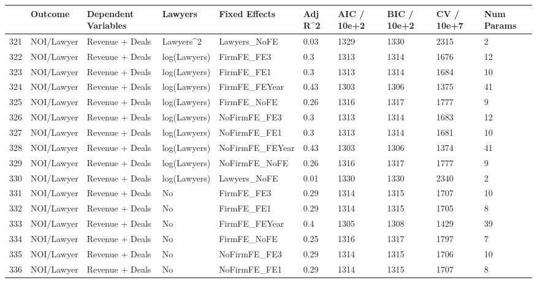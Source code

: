 \documentclass{article}
\begin{document}
\begin{table}[H]
\centering
\begin{tabular}{rlllllllll}
  \hline
 & Outcome & Dependent Variables & Lawyers & Fixed Effects & Adj R^2 & AIC / 10e+2 & BIC / 10e+2 & CV / 10e+7 & Num Params \\ 
  \hline
321 & NOI/Lawyer & Revenue + Deals & Lawyers^2 & Lawyers\_NoFE & 0.03 & 1329 & 1330 & 2315 & 2 \\ 
  322 & NOI/Lawyer & Revenue + Deals & log(Lawyers) & FirmFE\_FE3 & 0.3 & 1313 & 1314 & 1676 & 12 \\ 
  323 & NOI/Lawyer & Revenue + Deals & log(Lawyers) & FirmFE\_FE1 & 0.3 & 1313 & 1314 & 1684 & 10 \\ 
  324 & NOI/Lawyer & Revenue + Deals & log(Lawyers) & FirmFE\_FEYear & 0.43 & 1303 & 1306 & 1375 & 41 \\ 
  325 & NOI/Lawyer & Revenue + Deals & log(Lawyers) & FirmFE\_NoFE & 0.26 & 1316 & 1317 & 1777 & 9 \\ 
  326 & NOI/Lawyer & Revenue + Deals & log(Lawyers) & NoFirmFE\_FE3 & 0.3 & 1313 & 1314 & 1683 & 12 \\ 
  327 & NOI/Lawyer & Revenue + Deals & log(Lawyers) & NoFirmFE\_FE1 & 0.3 & 1313 & 1314 & 1681 & 10 \\ 
  328 & NOI/Lawyer & Revenue + Deals & log(Lawyers) & NoFirmFE\_FEYear & 0.43 & 1303 & 1306 & 1374 & 41 \\ 
  329 & NOI/Lawyer & Revenue + Deals & log(Lawyers) & NoFirmFE\_NoFE & 0.26 & 1316 & 1317 & 1777 & 9 \\ 
  330 & NOI/Lawyer & Revenue + Deals & log(Lawyers) & Lawyers\_NoFE & 0.01 & 1330 & 1330 & 2340 & 2 \\ 
  331 & NOI/Lawyer & Revenue + Deals & No & FirmFE\_FE3 & 0.29 & 1314 & 1315 & 1707 & 10 \\ 
  332 & NOI/Lawyer & Revenue + Deals & No & FirmFE\_FE1 & 0.29 & 1314 & 1315 & 1705 & 8 \\ 
  333 & NOI/Lawyer & Revenue + Deals & No & FirmFE\_FEYear & 0.4 & 1305 & 1308 & 1429 & 39 \\ 
  334 & NOI/Lawyer & Revenue + Deals & No & FirmFE\_NoFE & 0.25 & 1316 & 1317 & 1797 & 7 \\ 
  335 & NOI/Lawyer & Revenue + Deals & No & NoFirmFE\_FE3 & 0.29 & 1314 & 1315 & 1706 & 10 \\ 
  336 & NOI/Lawyer & Revenue + Deals & No & NoFirmFE\_FE1 & 0.29 & 1314 & 1315 & 1707 & 8 \\ 

\end{tabular}
\end{table}
\end{document}
